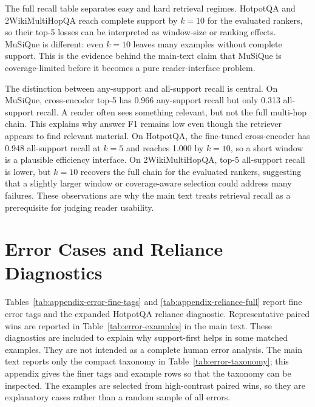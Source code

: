 \documentclass[a4paper,fleqn]{cas-sc}
\begin{document}
The full recall table separates easy and hard retrieval regimes. HotpotQA and
2WikiMultiHopQA reach complete support by $k=10$ for the evaluated rankers, so
their top-5 losses can be interpreted as window-size or ranking effects. MuSiQue
is different: even $k=10$ leaves many examples without complete support. This is
the evidence behind the main-text claim that MuSiQue is coverage-limited before
it becomes a pure reader-interface problem.

The distinction between any-support and all-support recall is central. On
MuSiQue, cross-encoder top-5 has 0.966 any-support recall but only 0.313
all-support recall. A reader often sees something relevant, but not the full
multi-hop chain. This explains why answer F1 remains low even though the
retriever appears to find relevant material. On HotpotQA, the fine-tuned
cross-encoder has 0.948 all-support recall at $k=5$ and reaches 1.000 by
$k=10$, so a short window is a plausible efficiency interface. On
2WikiMultiHopQA, top-5 all-support recall is lower, but $k=10$ recovers the
full chain for the evaluated rankers, suggesting that a slightly larger window
or coverage-aware selection could address many failures. These observations are
why the main text treats retrieval recall as a prerequisite for judging reader
usability.

\FloatBarrier
\section{Error Cases and Reliance Diagnostics}
\label{app:error-cases}

Tables~\ref{tab:appendix-error-fine-tags} and
\ref{tab:appendix-reliance-full} report fine error tags and the expanded
HotpotQA reliance diagnostic. Representative paired wins are reported in
Table~\ref{tab:error-examples} in the main text.
These diagnostics are included to explain why support-first helps in some
matched examples. They are not intended as a complete human error analysis.
The main text reports only the compact taxonomy in
Table~\ref{tab:error-taxonomy}; this appendix gives the finer tags and example
rows so that the taxonomy can be inspected. The examples are selected from
high-contrast paired wins, so they are explanatory cases rather than a random
sample of all errors.
\end{document}
